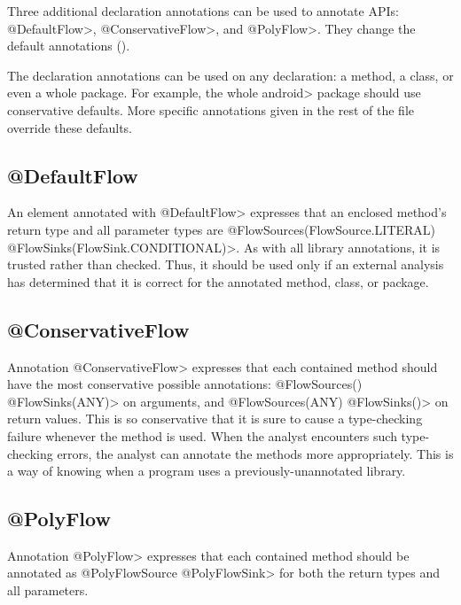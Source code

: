 Three additional declaration annotations can be used to annotate APIs:
\<@DefaultFlow>, \<@ConservativeFlow>, and \<@PolyFlow>. 
They change the default annotations ().
 
The declaration annotations can be used on any declaration: a method,
a class, or even a whole package.
For example, the
whole \<android> package should use conservative defaults.
More specific annotations given in the rest of the file override these
defaults.


\subsection{@DefaultFlow}

An element annotated with \<@DefaultFlow> expresses that an enclosed
method's return type and all parameter types are \<@FlowSources(FlowSource.LITERAL)
@FlowSinks(FlowSink.CONDITIONAL)>.  As with all 
library annotations, it is trusted rather than checked.  Thus, it should be
used only if an external analysis has determined that it is correct for the
annotated method, class, or package.




\subsection{@ConservativeFlow}

Annotation \<@ConservativeFlow> expresses that each contained method
should have the most conservative possible annotations:
  \<@FlowSources({}) @FlowSinks(ANY)> on arguments, and
  \<@FlowSources(ANY) @FlowSinks({})> on return values.
This is so conservative that it is sure to cause a type-checking failure
whenever the method is used.
When the analyst encounters such type-checking errors, the analyst can
annotate the methods more appropriately.  This is a way of knowing when a
program uses a previously-unannotated library.


\subsection{@PolyFlow\label{sec:polyflow}}

Annotation \<@PolyFlow> expresses that each contained method should be
annotated as \<@PolyFlowSource @PolyFlowSink> for both the return
types and all parameters.




